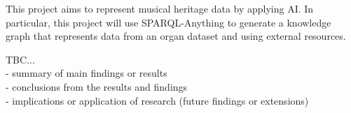 This project aims to represent musical heritage data by applying AI. In particular, this project will use SPARQL-Anything to generate a knowledge graph that represents data from an organ dataset and using external resources. 

TBC...
\\- summary of main findings or results
\\- conclusions from the results and findings
\\- implications or application of research (future findings or extensions)